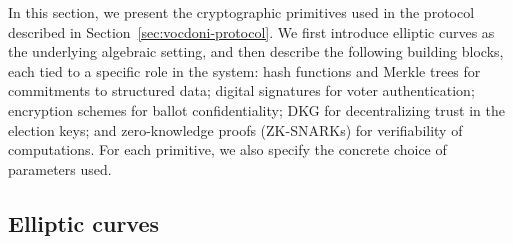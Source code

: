 

In this section, we present the cryptographic primitives used in the protocol described in Section~\ref{sec:vocdoni-protocol}. We first introduce elliptic curves as the underlying algebraic setting, and then describe the following building blocks, each tied to a specific role in the system: hash functions and Merkle trees for commitments to structured data; digital signatures for voter authentication; encryption schemes for ballot confidentiality; \ac{DKG} for decentralizing trust in the election keys; and zero-knowledge proofs (\acp{ZK-SNARK}) for verifiability of computations. For each primitive, we also specify the concrete choice of parameters used.


\subsection{Elliptic curves}
\label{sec:cryptographic-primitives:elliptic-curves}


